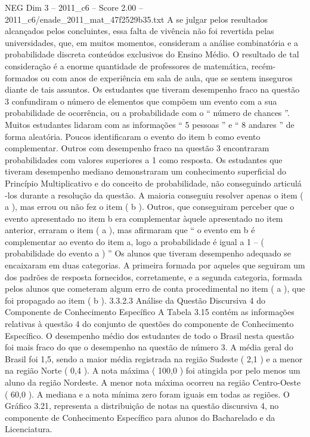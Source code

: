\begin{textsample}{NEG Dim 3 – 2011\_c6 – Score 2.00 – 2011\_c6/enade\_2011\_mat\_47f2529b35.txt}
A se julgar pelos resultados alcançados pelos concluintes, essa falta de vivência não foi revertida pelas universidades, que, em muitos momentos, consideram a análise combinatória e a probabilidade discreta conteúdos exclusivos do Ensino Médio.
O resultado de tal consideração é a enorme quantidade de professores de matemática, recém-formados ou com anos de experiência em sala de aula, que se sentem inseguros diante de tais assuntos.
Os estudantes que tiveram desempenho fraco na questão 3 confundiram o número de elementos que compõem um evento com a sua probabilidade de ocorrência, ou a probabilidade com o “ número de chances ”.
Muitos estudantes lidaram com as informações “ 5 pessoas ” e “ 8 andares ” de forma aleatória.
Poucos identificaram o evento do item b como evento complementar.
Outros com desempenho fraco na questão 3 encontraram probabilidades com valores superiores a 1 como resposta.
Os estudantes que tiveram desempenho mediano demonstraram um conhecimento superficial do Princípio Multiplicativo e do conceito de probabilidade, não conseguindo articulá -los durante a resolução da questão.
A maioria conseguiu resolver apenas o item ( a ), mas errou ou não fez o item ( b ).
Outros, que conseguiram perceber que o evento apresentado no item b era complementar àquele apresentado no item anterior, erraram o item ( a ), mas afirmaram que “ o evento em b é complementar ao evento do item a, logo a probabilidade é igual a 1 – ( probabilidade do evento a ) ” Os alunos que tiveram desempenho adequado se encaixaram em duas categorias.
A primeira formada por aqueles que seguiram um dos padrões de resposta fornecidos, corretamente, e a segunda categoria, formada pelos alunos que cometeram algum erro de conta procedimental no item ( a ), que foi propagado ao item ( b ). 3.3.2.3 Análise da Questão Discursiva 4 do Componente de Conhecimento Específico A Tabela 3.15 contém as informações relativas à questão 4 do conjunto de questões do componente de Conhecimento Específico.
O desempenho médio dos estudantes de todo o Brasil nesta questão foi mais fraco do que o desempenho na questão de número 3.
A média geral do Brasil foi 1,5, sendo a maior média registrada na região Sudeste ( 2,1 ) e a menor na região Norte ( 0,4 ).
A nota máxima ( 100,0 ) foi atingida por pelo menos um aluno da região Nordeste.
A menor nota máxima ocorreu na região Centro-Oeste ( 60,0 ).
A mediana e a nota mínima zero foram iguais em todas as regiões.
O Gráfico 3.21, representa a distribuição de notas na questão discursiva 4, no componente de Conhecimento Específico para alunos do Bacharelado e da Licenciatura.

\end{textsample}
